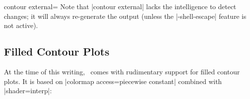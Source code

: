 {{\begin{plottype}[/pgfplots]{contour external=\textcolor{black}{}}
	Note that |contour external| lacks the intelligence to detect changes; it will always re-generate the output (unless the |-shell-escape| feature is not active).
\end{plottype}

% 
% 

}

\subsection{Filled Contour Plots}
{
\label{sec:pgfplots:filled:contour}%
%

At the time of this writing, \PGFPlots\ comes with rudimentary support for filled contour plots. It is based on |colormap access=piecewise constant| combined with |shader=interp|:

%
\pgfplotsexpensiveexample
\begin{codeexample}[]
\end{codeexample}

}}
